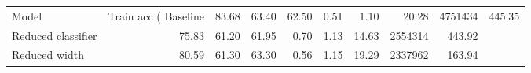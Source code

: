 \begin{tabular}{lrrrrrrrr}
\toprule
Model & Train acc (%
\midrule
Baseline & 83.68 & 63.40 & 62.50 & 0.51 & 1.10 & 20.28 & 4751434 & 445.35 \\
Reduced classifier & 75.83 & 61.20 & 61.95 & 0.70 & 1.13 & 14.63 & 2554314 & 443.92 \\
Reduced width & 80.59 & 61.30 & 63.30 & 0.56 & 1.15 & 19.29 & 2337962 & 163.94 \\
\bottomrule
\end{tabular}
